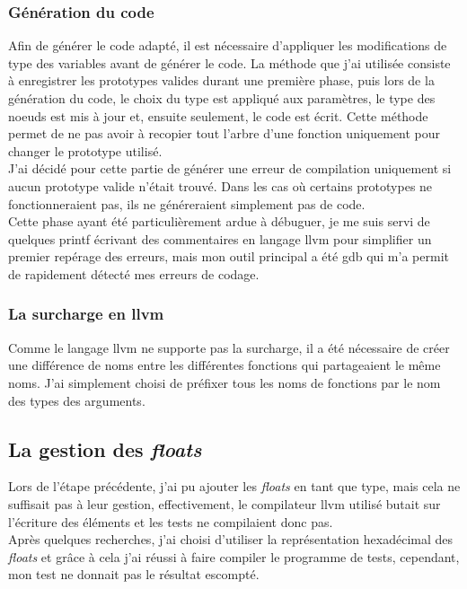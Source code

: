 \documentclass[12pt]{article}
\begin{document}
\subsubsection{Génération du code}
Afin de générer le code adapté, il est nécessaire d'appliquer les
modifications de type des variables avant de générer le code. La méthode
que j'ai utilisée consiste à enregistrer les prototypes valides durant une
première phase, puis lors de la génération du code, le choix du type est
appliqué aux paramètres, le type des noeuds est mis à jour et, ensuite
seulement, le code est écrit. Cette méthode permet de ne pas avoir à recopier
tout l'arbre d'une fonction uniquement pour changer le prototype utilisé.\\

J'ai décidé pour cette partie de générer une erreur de compilation uniquement
si aucun prototype valide n'était trouvé. Dans les cas où certains prototypes
ne fonctionneraient pas, ils ne généreraient simplement pas de code.\\

Cette phase ayant été particulièrement ardue à débuguer, je me suis servi de
quelques printf écrivant des commentaires en langage llvm pour simplifier
un premier repérage des erreurs, mais mon outil principal a été gdb qui m'a
permit de rapidement détecté mes erreurs de codage.

\subsubsection{La surcharge en llvm}
Comme le langage llvm ne supporte pas la surcharge, il a été nécessaire de
créer une différence de noms entre les différentes fonctions qui partageaient
le même noms. J'ai simplement choisi de préfixer tous les noms de fonctions
par le nom des types des arguments.

\subsection{La gestion des {\em floats}}
Lors de l'étape précédente, j'ai pu ajouter les {\em floats} en tant que
type, mais cela ne suffisait pas à leur gestion, effectivement, le
compilateur llvm utilisé butait sur l'écriture des éléments et les tests ne
compilaient donc pas.\\

Après quelques recherches, j'ai choisi d'utiliser la représentation
hexadécimal des {\em floats} et grâce à cela j'ai réussi à faire compiler le
programme de tests, cependant, mon test ne donnait pas le résultat escompté.
\\
\end{document}

